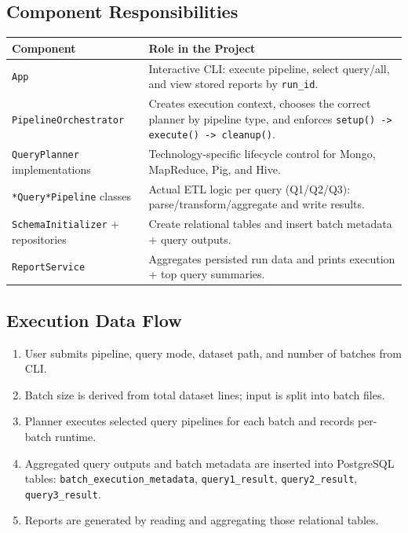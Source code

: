 \documentclass[12pt,a4paper]{article}
\begin{document}
\subsection{Component Responsibilities}

\begin{tabular}{p{} p{}}
\toprule
\textbf{Component} & \textbf{Role in the Project} \\
\midrule
\texttt{App} & Interactive CLI: execute pipeline, select query/all, and view stored reports by \texttt{run\_id}. \\
\texttt{PipelineOrchestrator} & Creates execution context, chooses the correct planner by pipeline type, and enforces \texttt{setup() -> execute() -> cleanup()}. \\
\texttt{QueryPlanner} implementations & Technology-specific lifecycle control for Mongo, MapReduce, Pig, and Hive. \\
\texttt{*Query*Pipeline} classes & Actual ETL logic per query (Q1/Q2/Q3): parse/transform/aggregate and write results. \\
\texttt{SchemaInitializer} + repositories & Create relational tables and insert batch metadata + query outputs. \\
\texttt{ReportService} & Aggregates persisted run data and prints execution + top query summaries. \\
\bottomrule
\end{tabular}

\subsection{Execution Data Flow}

\begin{enumerate}
  \item User submits pipeline, query mode, dataset path, and number of batches from CLI.
  \item Batch size is derived from total dataset lines; input is split into batch files.
  \item Planner executes selected query pipelines for each batch and records per-batch runtime.
  \item Aggregated query outputs and batch metadata are inserted into PostgreSQL tables:
  \texttt{batch\_execution\_metadata}, \texttt{query1\_result}, \texttt{query2\_result}, \texttt{query3\_result}.
  \item Reports are generated by reading and aggregating those relational tables.
\end{enumerate}
\end{document}
